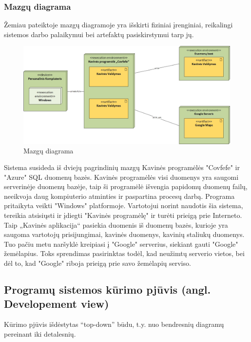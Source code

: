 \documentclass{VUMIFPSkursinis}
\begin{document}
\subsubsection{Mazgų diagrama}

Žemiau pateiktoje mazgų diagramoje yra išskirti fiziniai įrenginiai, reikalingi sistemos darbo palaikymui bei artefaktų pasiskirstymui tarp jų.
\begin{figure}[H]
    \centering
    \includegraphics[width=\textwidth,height=\textheight,keepaspectratio]{img/Deployment_diagram2} 
    \caption{Mazgų diagrama}
    \label{img:Model}
\end{figure}


Sistema susideda iš dviejų pagrindinių mazgų Kavinės programėlės "Covfefe" ir "Azure" SQL duomenų bazės. Kavinės programėlės visi duomenys yra saugomi serverinėje duomenų bazėje, taip ši programėlė išvengia papidomų duomenų failų, neeikvoja daug kompiuterio atminties ir paspartina procesų darbą. Programa pritaikyta veikti "Windows" platformoje. Vartotojui norint naudotis šia sistema, tereikia atsisiųsti ir įdiegti "Kavinės programėlę" ir turėti prieigą prie Interneto. Taip „Kavinės aplikacija“ pasiekia duomenis iš duomenų bazės, kurioje yra saugoma vartotojų prisijungimai, kavinės duomenys, kavinių staliukų duomenys. Tuo pačiu metu naršyklė kreipiasi į "Google" serverius, siekiant gauti "Google" žemėlapius. Toks sprendimas pasirinktas todėl, kad neužimtų serverio vietos, bei dėl to, kad "Google" riboja prieigą prie savo žemėlapių serviso. 


\subsection{Programų sistemos kūrimo pjūvis (angl. Developement view)}
Kūrimo pjūvis išdėstytas “top-down” būdu, t.y. nuo bendresnių
diagramų pereinant iki detalesnių.
\end{document}
